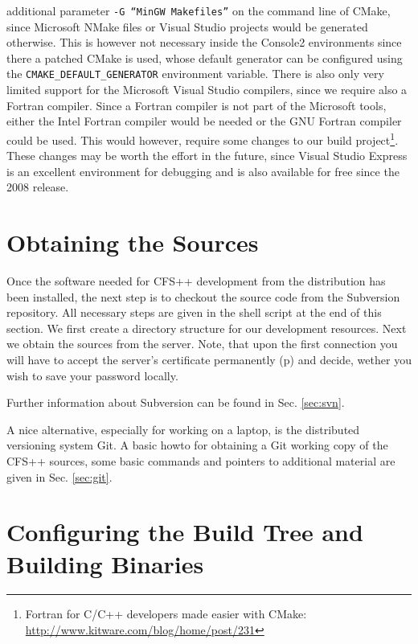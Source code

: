 additional  parameter {\tt  -G ``MinGW  Makefiles''}  on the  command line  of
CMake,  since  Microsoft  NMake  files  or Visual  Studio  projects  would  be
generated  otherwise.   This is  however  not  necessary inside  the  Console2
environments since there a patched CMake  is used, whose default generator can
be configured using the {\tt CMAKE\_DEFAULT\_GENERATOR} environment variable.%
%
There  is also  only  very limited  support for  the  Microsoft Visual  Studio
compilers, since we require also a  Fortran compiler. Since a Fortran compiler
is not part of the Microsoft tools, either the Intel Fortran compiler would be
needed or the GNU Fortran compiler could be used.  This would however, require
some changes to  our build project\footnote{Fortran for  C/C++ developers made
  easier  with CMake:  \url{http://www.kitware.com/blog/home/post/231}}. These
changes may be worth the effort in  the future, since Visual Studio Express is
an excellent  environment for debugging and  is also available for  free since
the 2008 release.

\newpage
\section{Obtaining the Sources}

Once the software  needed for CFS++ development from  the distribution has
been installed,  the next  step is  to checkout the  source code  from the
Subversion  \cite{svn} repository. All  necessary steps  are given  in the
shell  script at  the end  of this  section. We  first create  a directory
structure for our  development resources. Next we obtain  the sources from
the server. Note,  that upon the first connection you  will have to accept
the server's  certificate permanently (p)  and decide, wether you  wish to
save your password locally.



Further information  about Subversion can be found  in Sec. \ref{sec:svn}.

A nice alternative, especially for working on a laptop, is the distributed
versioning system Git.  A basic howto for obtaining a  Git working copy of
the CFS++ sources, some basic commands and pointers to additional material
are given in Sec. \ref{sec:git}.

\section{Configuring the Build Tree and Building Binaries}

